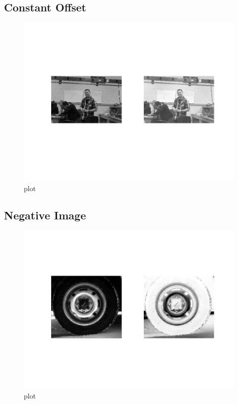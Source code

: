 \subsection{Constant Offset}

\begin{figure}[H]
    \centering
    \includegraphics{twoPeters}
    \caption{plot}
\end{figure}

\subsection{Negative Image}

\begin{figure}[H]
    \centering
    \includegraphics{tire_neg}
    \caption{plot}
\end{figure}

